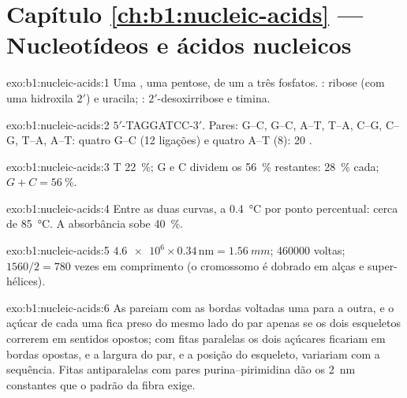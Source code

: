 \section*{Capítulo \ref{ch:b1:nucleic-acids} --- Nucleotídeos e ácidos nucleicos}

\begin{solution}{exo:b1:nucleic-acids:1}
Uma , uma pentose, de um a três fosfatos. : ribose
(com uma hidroxila $2'$) e uracila; : $2'$-desoxirribose e timina.
\end{solution}

\begin{solution}{exo:b1:nucleic-acids:2}
$5'$-TAGGATCC-$3'$. Pares: G--C, G--C, A--T, T--A, C--G, C--G, T--A,
A--T: quatro G--C (12 ligações) e quatro A--T (8): 20 .
\end{solution}

\begin{solution}{exo:b1:nucleic-acids:3}
T \qty{22}{\%}; G e C dividem os \qty{56}{\%} restantes: \qty{28}{\%}
cada; $G + C = \qty{56}{\%}$.
\end{solution}

\begin{solution}{exo:b1:nucleic-acids:4}
Entre as duas curvas, a \qty{0.4}{\celsius} por ponto percentual: cerca
de \qty{85}{\celsius}. A absorbância sobe \qty{40}{\%}.
\end{solution}

\begin{solution}{exo:b1:nucleic-acids:5}
$\num{4.6e6}\times 0.34\,\mathrm{nm} = \qty{1.56}{mm}$; \num{460000}
voltas; $1560/2 = 780$ vezes em comprimento (o cromossomo é dobrado em
alças e super-hélices).
\end{solution}

\begin{solution}{exo:b1:nucleic-acids:6}
As  pareiam com as bordas voltadas uma para a outra, e o açúcar de
cada uma fica preso do mesmo lado do par apenas se os dois esqueletos
correrem em sentidos opostos; com fitas paralelas os dois açúcares
ficariam em bordas opostas, e a largura do par, e a posição do
esqueleto, variariam com a sequência. Fitas antiparalelas com pares
purina--pirimidina dão os \qty{2}{nm} constantes que o padrão da fibra
exige.
\end{solution}

